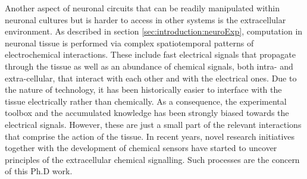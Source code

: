     Another aspect of neuronal circuits that can be readily manipulated within neuronal cultures but is harder to access in other systems is the extracellular environment. As described in section \ref{sec:introduction:neuroExp}, computation in neuronal tissue is performed via complex spatiotemporal patterns of electrochemical interactions. These include fast electrical signals that propagate through the tissue as well as an abundance of chemical signals, both intra- and extra-cellular, that interact with each other and with the electrical ones. Due to the nature of technology, it has been historically easier to interface with the tissue electrically rather than chemically. As a consequence, the experimental toolbox and the accumulated knowledge has been strongly biased towards the electrical signals. However, these are just a small part of the relevant interactions that comprise the action of the tissue. In recent years, novel research initiatives together with the development of chemical sensors have started to uncover principles of the extracellular chemical signalling. Such processes are the concern of this Ph.D work.




